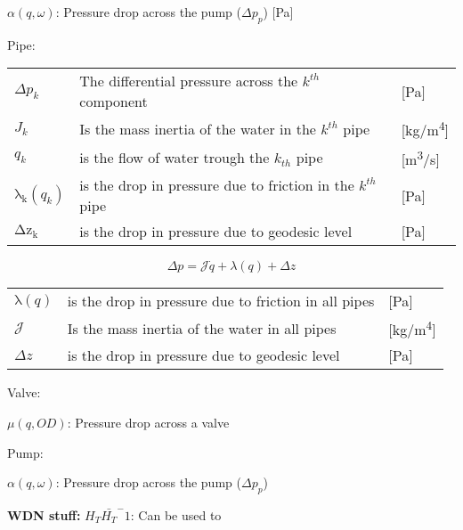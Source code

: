 $\alpha(q,\omega)$: Pressure drop across the pump ($\Delta p_p$) [\si{Pa}]


Pipe:
\begin{center}
	\begin{tabular}{l p{10cm} l}
		
		$\Delta{p_{k}}$ & The differential pressure across the $k^{th}$ component & [\si{Pa}]\\ 
		${J_{k}}$ & Is the mass inertia of the water in the $k^{th}$ pipe & [\si{kg}/\si{m^{4}}] \\
		$q_{k}$ & is the flow of water trough the $k_{th}$ pipe & [{\si{\meter\cubed}/\si{s}}] \\
		$\mathrm{\lambda_{k}}(q_{k})$ & is the drop in pressure due to friction in the $k^{th}$ pipe & [\si{Pa}] \\
		$\mathrm{\Delta{z_{k}}}$ & is the drop in pressure due to geodesic level & [\si{Pa}]\\
	\end{tabular}
\end{center}


\begin{equation}
	\Delta{p} = \mathcal{J}\dot{q} + \lambda(q) + \Delta z
\end{equation}

\begin{center}
	\begin{tabular}{l p{10cm} l}
		$\mathrm{\lambda}(q)$ & is the drop in pressure due to friction in all pipes & [\si{Pa}] \\
		$ \mathcal{J}$ & Is the mass inertia of the water in all pipes & [\si{kg}/\si{m^{4}}] \\
		$\Delta z$ & is the drop in pressure due to geodesic level & [\si{Pa}]\\
	\end{tabular}
\end{center}


Valve:

$\mu(q,OD)$: Pressure drop across a valve

Pump:

$\alpha(q,\omega)$: Pressure drop across the pump ($\Delta p_p$)


\textbf{WDN stuff:}
$H_T \bar{H_T}^-1$: Can be used to



